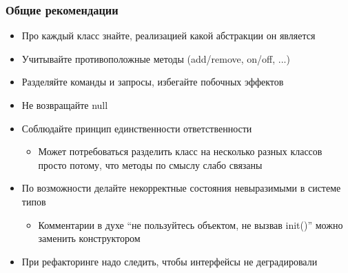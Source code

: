 \documentclass{../../slides-style}
\begin{document}
    \begin{frame}
        \frametitle{Общие рекомендации}
        \begin{itemize}
            \item Про каждый класс знайте, реализацией какой абстракции он является
            \item Учитывайте противоположные методы (add/remove, on/off, ...)
            \item Разделяйте команды и запросы, избегайте побочных эффектов
            \item Не возвращайте null
            \item Соблюдайте принцип единственности ответственности
            \begin{itemize}
                \item Может потребоваться разделить класс на несколько разных классов просто потому, что методы по смыслу слабо связаны
            \end{itemize}
            \item По возможности делайте некорректные состояния невыразимыми в системе типов
            \begin{itemize}
                \item Комментарии в духе ``не пользуйтесь объектом, не вызвав  init()'' можно заменить конструктором
            \end{itemize}
            \item При рефакторинге надо следить, чтобы интерфейсы не деградировали
        \end{itemize}
    \end{frame}
\end{document}

